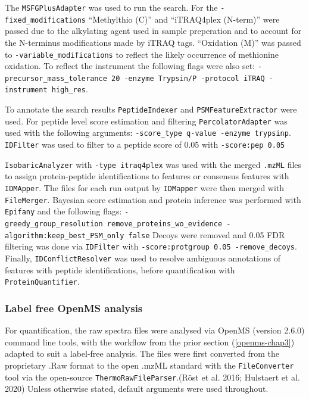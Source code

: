 \documentclass[9pt,lineno]{elife}
\begin{document}
The \texttt{MSFGPlusAdapter} was used to run the search.
For the \texttt{-fixed\_modifications} ``Methylthio (C)'' and ``iTRAQ4plex (N-term)'' were passed due to the alkylating agent used in sample preperation and to account for the N-terminus modifications made by iTRAQ tags.
``Oxidation (M)'' was passed to \texttt{-variable\_modifications} to reflect the likely occurrence of methionine oxidation.
To reflect the instrument the following flags were also set: \texttt{-precursor\_mass\_tolerance\ 20\ -enzyme\ Trypsin/P\ -protocol\ iTRAQ\ -instrument\ high\_res}.

To annotate the search results \texttt{PeptideIndexer} and \texttt{PSMFeatureExtractor} were used.
For peptide level score estimation and filtering \texttt{PercolatorAdapter} was used with the following arguments: \texttt{-score\_type\ q-value\ -enzyme\ trypsinp}.
\texttt{IDFilter} was used to filter to a peptide score of 0.05 with \texttt{-score:pep\ 0.05}

\texttt{IsobaricAnalyzer} with \texttt{-type\ itraq4plex} was used with the merged \texttt{.mzML} files to assign protein-peptide identifications to features or consensus features with \texttt{IDMApper}.
The files for each run output by \texttt{IDMapper} were then merged with \texttt{FileMerger}.
Bayesian score estimation and protein inference was performed with \texttt{Epifany} and the following flags: \texttt{-greedy\_group\_resolution\ remove\_proteins\_wo\_evidence\ -algorithm:keep\_best\_PSM\_only\ false}
Decoys were removed and 0.05 FDR filtering was done via \texttt{IDFilter} with \texttt{-score:protgroup\ 0.05\ -remove\_decoys}.
Finally, \texttt{IDConflictResolver} was used to resolve ambiguous annotations of features with peptide identifications, before quantification with \texttt{ProteinQuantifier}.

\hypertarget{openms-label-free}{%
\subsubsection{Label free OpenMS analysis}\label{openms-label-free}}

For quantification, the raw spectra files were analysed via OpenMS (version 2.6.0) command line tools, with the workflow from the prior section (\ref{openms-chap3}) adapted to suit a label-free analysis.
The files were first converted from the proprietary .Raw format to the open .mzML standard with the \texttt{FileConverter} tool via the open-source \texttt{ThermoRawFileParser}.(Röst et al. 2016; Hulstaert et al. 2020)
Unless otherwise stated, default arguments were used throughout.
\end{document}
